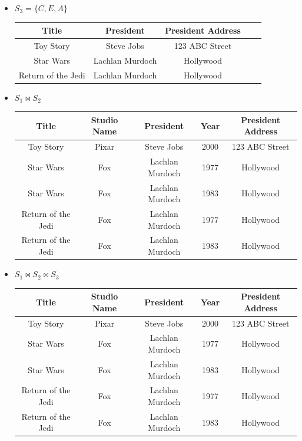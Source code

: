 \documentclass[12pt]{article}
\begin{document}
\begin{enumerate}[1.]
\begin{enumerate}[a)]
\begin{itemize}
            \item $S_3 = \{C,E,A\}$

            \bigskip

            \begin{tabular}{|c|c|c|c|c|}
                \hline
                Title & President & President Address\\
                \hline
                Toy Story & Steve Jobs & 123 ABC Street\\
                \hline
                Star Wars & Lachlan Murdoch & Hollywood\\
                \hline
                Return of the Jedi & Lachlan Murdoch & Hollywood\\
                \hline
            \end{tabular}

            \item $S_1 \bowtie S_2$

            \begin{tabular}{|c|c|c|c|c|}
                \hline
                Title & Studio Name & President & Year & President Address\\
                \hline
                Toy Story & Pixar & Steve Jobs & 2000 & 123 ABC Street\\
                \hline
                Star Wars & Fox & Lachlan Murdoch & 1977 & Hollywood\\
                \hline
                Star Wars & Fox & Lachlan Murdoch & 1983 & Hollywood\\
                \hline
                Return of the Jedi & Fox & Lachlan Murdoch & 1977 & Hollywood\\
                \hline
                Return of the Jedi & Fox & Lachlan Murdoch & 1983 & Hollywood\\
                \hline
            \end{tabular}

            \item $S_1 \bowtie S_2 \bowtie S_3$

            \begin{tabular}{|c|c|c|c|c|}
                \hline
                Title & Studio Name & President & Year & President Address\\
                \hline
                Toy Story & Pixar & Steve Jobs & 2000 & 123 ABC Street\\
                \hline
                Star Wars & Fox & Lachlan Murdoch & 1977 & Hollywood\\
                \hline
                Star Wars & Fox & Lachlan Murdoch & 1983 & Hollywood\\
                \hline
                Return of the Jedi & Fox & Lachlan Murdoch & 1977 & Hollywood\\
                \hline
                Return of the Jedi & Fox & Lachlan Murdoch & 1983 & Hollywood\\
                \hline
            \end{tabular}


\end{itemize}
\end{enumerate}
\end{enumerate}
\end{document}
